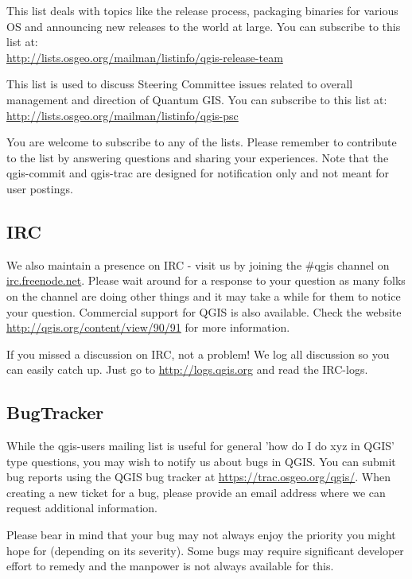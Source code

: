 This list deals with topics like the release process, packaging binaries for
various OS and announcing new releases to the world at large. You can
subscribe to this list at:\\
\url{http://lists.osgeo.org/mailman/listinfo/qgis-release-team}

This list is used to discuss Steering Committee issues related to overall
management and direction of Quantum GIS. You can subscribe to this list at:\\
\url{http://lists.osgeo.org/mailman/listinfo/qgis-psc}

You are welcome to subscribe to any of the lists. Please remember to
contribute to the list by answering questions and sharing your experiences.
Note that the qgis-commit and qgis-trac are designed for notification only
and not meant for user postings. 

\subsection{IRC}
We also maintain a presence on IRC - visit us by joining the \#qgis channel on
\url{irc.freenode.net}. Please wait around for a response to your question as many
folks on the channel are doing other things and it may take a while for them to
notice your question. Commercial support for QGIS is also available.
Check the website \url{http://qgis.org/content/view/90/91} for more information.

If you missed a discussion on IRC, not a problem! We log all discussion so you can 
easily catch up. Just go to \url{http://logs.qgis.org} and read the IRC-logs.

\subsection{BugTracker}
While the qgis-users mailing list is useful for general 'how do I do xyz in
QGIS' type questions, you may wish to notify us about bugs in QGIS. You can
submit bug reports using the QGIS bug tracker at \url{https://trac.osgeo.org/qgis/}. 
When creating a new ticket for a bug, please provide an email
address where we can request additional information.

Please bear in
mind that your bug may not always enjoy the priority you might hope for
(depending on its severity). Some bugs may require significant
developer effort to remedy and the manpower is not always available for this.


